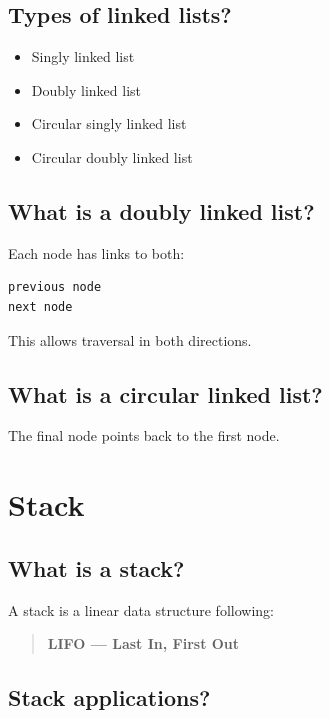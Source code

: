 \medskip

\subsection{Types of linked lists?}

\begin{itemize}
  \item Singly linked list
  \item Doubly linked list
  \item Circular singly linked list
  \item Circular doubly linked list
\end{itemize}

\medskip

\subsection{What is a doubly linked list?}

Each node has links to both:

\begin{lstlisting}
previous node
next node
\end{lstlisting}

This allows traversal in both directions.

\medskip

\subsection{What is a circular linked list?}

The final node points back to the first node.

\medskip

\section{Stack}

\subsection{What is a stack?}

A stack is a linear data structure following:

\begin{quote}
\textbf{LIFO --- Last In, First Out}\\
\end{quote}

\medskip

\subsection{Stack applications?}

